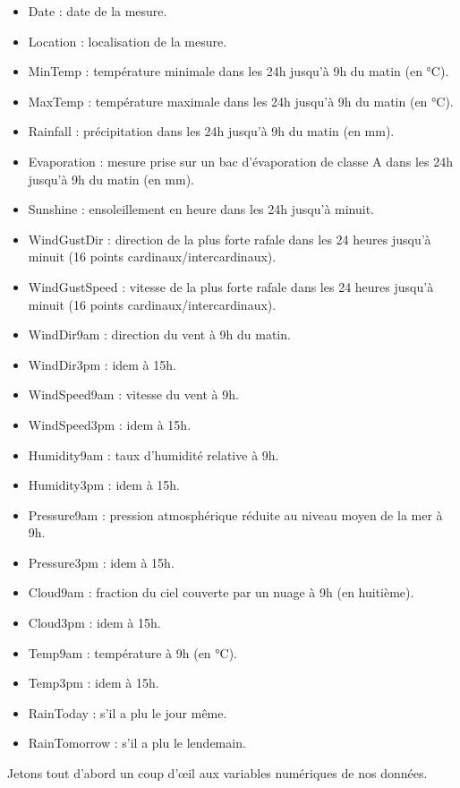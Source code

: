 \documentclass{article}
\begin{document}
\begin{itemize}
    \item Date : date de la mesure.
    \item Location : localisation de la mesure.
    \item MinTemp : température minimale dans les 24h jusqu'à 9h du matin (en °C).
    \item MaxTemp : température maximale dans les 24h jusqu'à 9h du matin (en °C).
    \item Rainfall : précipitation dans les 24h jusqu'à 9h du matin (en mm).
    \item Evaporation : mesure prise sur un bac d'évaporation de classe A dans les 24h jusqu'à 9h du matin (en mm).
    \item Sunshine : ensoleillement en heure dans les 24h jusqu'à minuit.
    \item WindGustDir : direction de la plus forte rafale dans les 24 heures jusqu'à minuit (16 points cardinaux/intercardinaux).   
    \item WindGustSpeed : vitesse de la plus forte rafale dans les 24 heures jusqu'à minuit (16 points cardinaux/intercardinaux).
    \item WindDir9am : direction du vent à 9h du matin.
    \item WindDir3pm : idem à 15h.
    \item WindSpeed9am : vitesse du vent à 9h.
    \item WindSpeed3pm : idem à 15h.
    \item Humidity9am : taux d'humidité relative à 9h.
    \item Humidity3pm : idem à 15h.
    \item Pressure9am : pression atmosphérique réduite au niveau moyen de la mer à 9h.
    \item Pressure3pm : idem à 15h.
    \item Cloud9am : fraction du ciel couverte par un nuage à 9h (en huitième).   
    \item Cloud3pm : idem à 15h.
    \item Temp9am : température à 9h (en °C).
    \item Temp3pm : idem à 15h.
    \item RainToday : s'il a plu le jour même.
    \item RainTomorrow : s'il a plu le lendemain.   
\end{itemize}
Jetons tout d'abord un coup d'œil aux variables numériques de nos données. 
\end{document}
